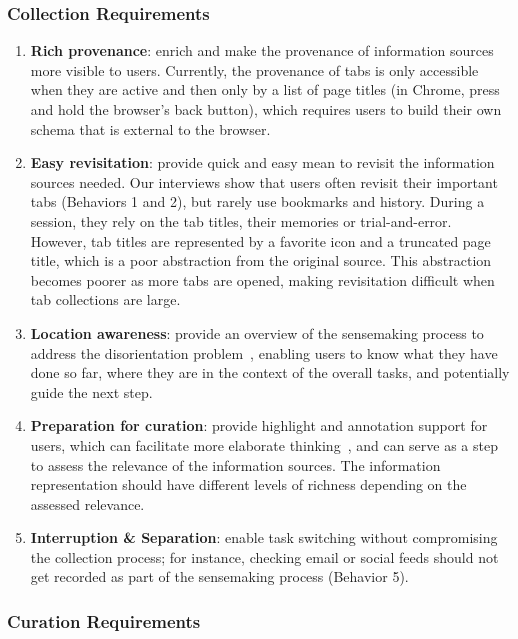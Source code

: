 \subsubsection{Collection Requirements}

\begin{enumerate}
	\item \textbf{Rich provenance}: enrich and make the provenance of information sources more visible to users. Currently, the provenance of tabs is only accessible when they are active and then only by a list of page titles (in Chrome, press and hold the browser's back button), which requires users to build their own schema that is external to the browser.
	\item \textbf{Easy revisitation}: provide quick and easy mean to revisit the information sources needed. Our interviews show that users often revisit their important tabs (Behaviors 1 and 2), but rarely use bookmarks and history. During a session, they rely on the tab titles, their memories or trial-and-error. However, tab titles are represented by a favorite icon and a truncated page title, which is a poor abstraction from the original source. This abstraction becomes poorer as more tabs are opened, making revisitation difficult when tab collections are large.
	\item \textbf{Location awareness}: provide an overview of the sensemaking process to address the disorientation problem~\cite{Conklin1987}, enabling users to know what they have done so far, where they are in the context of the overall tasks, and potentially guide the next step.
	\item \textbf{Preparation for curation}: provide highlight and annotation support for users, which can facilitate more elaborate thinking~\cite{Sedig2013}, and can serve as a step to assess the relevance of the information sources. The information representation should have different levels of richness depending on the assessed relevance.
	\item \textbf{Interruption \& Separation}: enable task switching without compromising the collection process; for instance, checking email or social feeds should not get recorded as part of the sensemaking process (Behavior 5).

	\setcounter{listnum}{\theenumi}
\end{enumerate}

\subsubsection{Curation Requirements}

